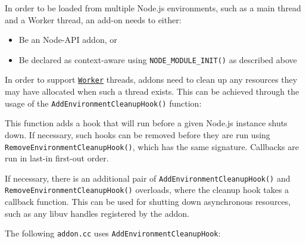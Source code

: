 In order to be loaded from multiple Node.js environments, such as a main
thread and a Worker thread, an add-on needs to either:

\begin{itemize}
\tightlist
\item
  Be an Node-API addon, or
\item
  Be declared as context-aware using \texttt{NODE\_MODULE\_INIT()} as
  described above
\end{itemize}

In order to support
\href{worker_threads.md\#class-worker}{\texttt{Worker}} threads, addons
need to clean up any resources they may have allocated when such a
thread exists. This can be achieved through the usage of the
\texttt{AddEnvironmentCleanupHook()} function:

\begin{Shaded}
\begin{Highlighting}[]
\OperatorTok{(}\OperatorTok{::}\OperatorTok{*}\OperatorTok{,}
                                \OperatorTok{(*}\OperatorTok{)(}\OperatorTok{*}\OperatorTok{),}
                               \OperatorTok{*}\OperatorTok{);}
\end{Highlighting}
\end{Shaded}

This function adds a hook that will run before a given Node.js instance
shuts down. If necessary, such hooks can be removed before they are run
using \texttt{RemoveEnvironmentCleanupHook()}, which has the same
signature. Callbacks are run in last-in first-out order.

If necessary, there is an additional pair of
\texttt{AddEnvironmentCleanupHook()} and
\texttt{RemoveEnvironmentCleanupHook()} overloads, where the cleanup
hook takes a callback function. This can be used for shutting down
asynchronous resources, such as any libuv handles registered by the
addon.

The following \texttt{addon.cc} uses \texttt{AddEnvironmentCleanupHook}:

